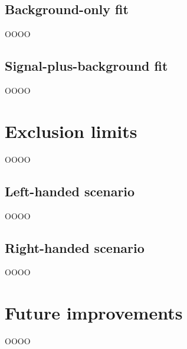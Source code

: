 \subsection{Background-only fit}
\label{heading:Chapters-CH10-9}

OOOO

\subsection{Signal-plus-background fit}
\label{heading:Chapters-CH10-10}

OOOO

\section{Exclusion limits}
\label{heading:Chapters-CH10-11}

OOOO

\subsection{Left-handed scenario}
\label{heading:Chapters-CH10-12}

OOOO

\subsection{Right-handed scenario}
\label{heading:Chapters-CH10-13}

OOOO

\section{Future improvements}
\label{heading:Chapters-CH10-14}

OOOO

